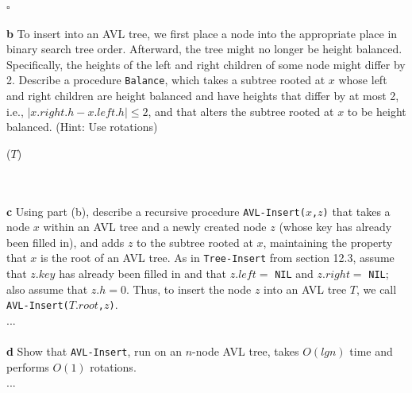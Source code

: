 \documentclass[11pt,english]{article}
\begin{document}
\hfill $\square$
\\\\
\noindent \large{\textbf{b} \mdseries To insert into an AVL tree, we first
place a node into the appropriate place in binary search tree order.
Afterward, the tree might no longer be height balanced. Specifically, the
heights of the left and right children of some node might differ by 2.
Describe a procedure \texttt{Balance}, which takes a subtree rooted at $x$
whose left and right children are height balanced and have heights that differ
by at most 2, i.e., $|x.right.h - x.left.h| \leq 2$, and that alters the
subtree rooted at $x$ to be height balanced. (Hint: Use rotations)}
\\
\begin{algorithm}
	\BlankLine
	
	\Balance($T$) \\
	\Begin
	{
		{
			
		}
	}
\end{algorithm}
\\\\
\noindent \large{\textbf{c} \mdseries Using part (b), describe a recursive
procedure \texttt{AVL-Insert($x$,$z$)} that takes a node $x$ within an AVL
tree and a newly created node $z$ (whose key has already been filled in), and
adds $z$ to the subtree rooted at $x$, maintaining the property that $x$ is
the root of an AVL tree. As in \texttt{Tree-Insert} from section 12.3, assume
that $z.key$ has already been filled in and that $z.left =$ \texttt{NIL} and
$z.right =$ \texttt{NIL}; also assume that $z.h = 0$. Thus, to insert the node
$z$ into an AVL tree $T$, we call \texttt{AVL-Insert($T.root$,$z$)}.}
\\
...
\\\\
\noindent \large{\textbf{d} \mdseries Show that \texttt{AVL-Insert}, run on an
$n$-node AVL tree, takes $O(lg n)$ time and performs $O(1)$ rotations.}
\\
...








\end{document}

